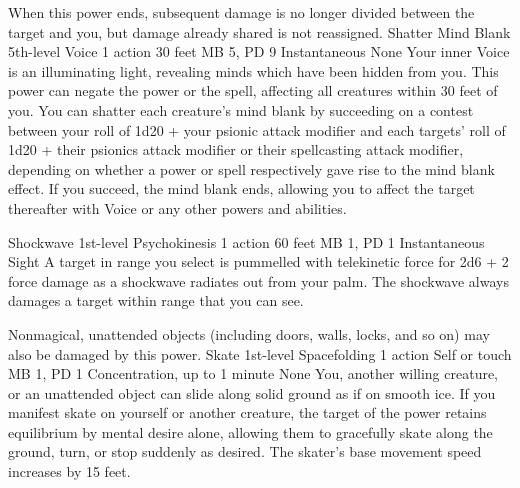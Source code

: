 When this power ends, subsequent damage is no longer divided
between the target and you, but damage already shared is not
reassigned.
\DndPowerHeader%
    {Shatter Mind Blank\label{pwr:shatter_mind_blank}}
    {5th-level Voice}
    {1 action}
    {30 feet}
    {MB 5, PD 9}
    {Instantaneous}
    {None}
Your inner Voice is an illuminating light, revealing
minds which have been hidden from you. This power can negate
the  power or the 
spell, affecting all creatures within 30 feet of you. You
can shatter each creature's mind blank by succeeding on a
contest between your roll of 1d20 + your psionic attack modifier
and each targets' roll of 1d20 + their psionics attack modifier
or their spellcasting attack modifier, depending on whether
a power or spell respectively gave rise to the mind blank
effect. If you succeed, the mind blank ends, allowing
you to affect the target thereafter with Voice or any other
powers and abilities.

\DndPowerHeader%
    {Shockwave\label{pwr:shockwave}}
    {1st-level Psychokinesis}
    {1 action}
    {60 feet}
    {MB 1, PD 1}
    {Instantaneous}
    {Sight}
A target in range you select is pummelled
with telekinetic force for 2d6 + 2 force damage as a shockwave
radiates out from your palm. The shockwave always damages
a target within range that you can see.

Nonmagical, unattended objects (including doors, walls, locks,
and so on) may also be damaged by this power.
\DndPowerHeader%
    {Skate\label{pwr:skate}}
    {1st-level Spacefolding}
    {1 action}
    {Self or touch}
    {MB 1, PD 1}
    {Concentration, up to 1 minute}
    {None}
You, another willing creature, or an unattended
object can slide along solid ground as if on smooth ice. If
you manifest skate on yourself or another creature, the target
of the power retains equilibrium by mental desire alone, allowing
them to gracefully skate along the ground, turn, or stop suddenly
as desired. The skater's base movement speed increases by
15 feet.

